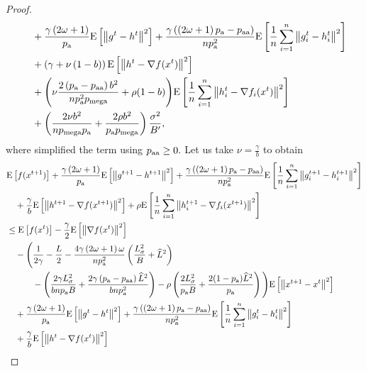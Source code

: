 \documentclass{article}
\newcommand*{\probavailable}{\ensuremath{p_{\textnormal{a}}}}
\newcommand*{\probpairaa}{\ensuremath{p_{\textnormal{aa}}}}
\newcommand*{\probmega}{\ensuremath{p_{\text{mega}}}}
\begin{document}
\begin{proof}
\begin{align*}
    &\quad + \frac{\gamma \left(2 \omega + 1\right)}{\probavailable} \Exp{\norm{g^{t} - h^{t}}^2} + \frac{\gamma\left(\left(2 \omega + 1\right)\probavailable - \probpairaa\right)}{n \probavailable^2}\Exp{\frac{1}{n}\sum_{i=1}^n\norm{g^{t}_i - h^{t}_i}^2} \\
    &\quad + \left(\gamma + \nu \left(1 - b\right)\right) \Exp{\norm{h^{t} - \nabla f(x^{t})}^2} \\
    &\quad + \Bigg(\nu \frac{2\left(\probavailable - \probpairaa\right) b^2}{n \probavailable^2 \probmega} + \rho (1 - b)\Bigg)\Exp{\frac{1}{n}\sum_{i=1}^n\norm{h^{t}_i - \nabla f_i(x^{t})}^2} \\
    &\quad + \left(\frac{2 \nu b^2}{n \probmega \probavailable} + \frac{2 \rho b^2}{\probavailable \probmega}\right) \frac{\sigma^2}{B'},
  \end{align*}
  where simplified the term using $\probpairaa \geq 0.$ Let us take $\nu = \frac{\gamma}{b}$ to obtain
  \begin{align*}
    &\Exp{f(x^{t + 1})} + \frac{\gamma \left(2 \omega + 1\right)}{\probavailable} \Exp{\norm{g^{t+1} - h^{t+1}}^2} + \frac{\gamma\left(\left(2 \omega + 1\right)\probavailable - \probpairaa\right)}{n \probavailable^2} \Exp{\frac{1}{n}\sum_{i=1}^n\norm{g^{t+1}_i - h^{t+1}_i}^2}\\
    &\quad  + \frac{\gamma}{b} \Exp{\norm{h^{t+1} - \nabla f(x^{t+1})}^2} + \rho \Exp{\frac{1}{n}\sum_{i=1}^n\norm{h^{t+1}_i - \nabla f_i(x^{t+1})}^2}\\
    &\leq \Exp{f(x^t)} - \frac{\gamma}{2}\Exp{\norm{\nabla f(x^t)}^2} \\
    &\quad - \Bigg(\frac{1}{2\gamma} - \frac{L}{2} - \frac{4 \gamma \left(2\omega + 1\right) \omega}{n \probavailable^2}\left(\frac{L_{\sigma}^2}{B} + \widehat{L}^2\right) \\
    &\qquad\quad - \left(\frac{2 \gamma L_{\sigma}^2}{b n \probavailable B} + \frac{2\gamma\left(\probavailable - \probpairaa\right) \widehat{L}^2}{b n \probavailable^2}\right) - \rho \left(\frac{2 L_{\sigma}^2}{\probavailable B} + \frac{2(1 - \probavailable) \widehat{L}^2}{\probavailable}\right)\Bigg) \Exp{\norm{x^{t+1} - x^t}^2} \\
    &\quad + \frac{\gamma \left(2 \omega + 1\right)}{\probavailable} \Exp{\norm{g^{t} - h^{t}}^2} + \frac{\gamma\left(\left(2 \omega + 1\right)\probavailable - \probpairaa\right)}{n \probavailable^2}\Exp{\frac{1}{n}\sum_{i=1}^n\norm{g^{t}_i - h^{t}_i}^2} \\
    &\quad + \frac{\gamma}{b} \Exp{\norm{h^{t} - \nabla f(x^{t})}^2} \\

\end{align*}
\end{proof}
\end{document}
